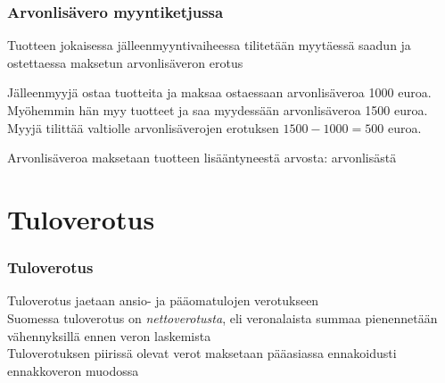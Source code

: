 \documentclass[]{beamer}\usepackage[]{graphicx}\usepackage[]{color}
\newcommand{\pblock}{\\ \vspace{0.5cm}\pause}
\newcommand{\socrativeOhje}{
\begin{itemize}
\item Surffaa osoitteeseen \url{m.socrative.com} (tai \url{socrative.com})
\item Siirry huoneeseen nimeltä \url{hruoho}
\end{itemize}
}
\newcommand{\taukoKysymys}{
\socrativeOhje
	\begin{block}{Kysymys}
	Mielestäni tähän väliin täydellinen tauko on
	\begin{enumerate}[(A)]
		\item 10 min
		\item 20 min
		\item 30 min
		\item Vähemmän 
		\item Enemmän
	\end{enumerate}	
	\end{block}
}
\begin{document}

\begin{frame}
  \frametitle{Arvonlisävero myyntiketjussa} 
  Tuotteen jokaisessa jälleenmyyntivaiheessa tilitetään myytäessä saadun ja  ostettaessa maksetun arvonlisäveron erotus\pause
  \begin{esim}
  Jälleenmyyjä ostaa tuotteita ja maksaa ostaessaan arvonlisäveroa 1000 euroa.
  \pause Myöhemmin hän myy tuotteet ja saa myydessään arvonlisäveroa 1500 euroa.
  \pause Myyjä tilittää valtiolle arvonlisäverojen erotuksen \(1500-1000=500\) euroa.
  \end{esim}\pause
  Arvonlisäveroa maksetaan tuotteen lisääntyneestä arvosta: arvonlisästä
\end{frame}


\section{Tuloverotus}

\begin{frame}
  \frametitle{Tuloverotus}
  \pause
  Tuloverotus jaetaan ansio- ja pääomatulojen verotukseen
  \pblock
  Suomessa tuloverotus on \emph{nettoverotusta}, eli veronalaista summaa pienennetään vähennyksillä ennen veron laskemista 
  \pblock
  Tuloverotuksen piirissä olevat verot maksetaan pääasiassa ennakoidusti ennakkoveron muodossa
\end{frame}
\end{document}
